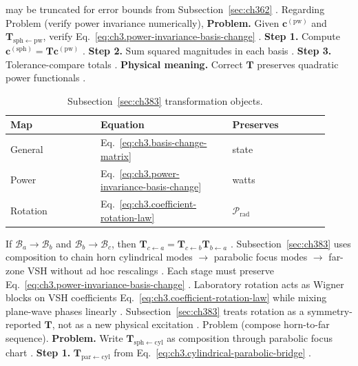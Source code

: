 may be truncated for error bounds from Subsection~\ref{sec:ch362} \cite{harrington2001}.
Regarding Problem (verify power invariance numerically), \textbf{Problem.} Given \(\mathbf{c}^{(\mathrm{pw})}\) and \(\mathbf{T}_{\mathrm{sph}\leftarrow\mathrm{pw}}\), verify
Eq.~\eqref{eq:ch3.power-invariance-basis-change} \cite{harrington2001}.
\textbf{Step 1.} Compute \(\mathbf{c}^{(\mathrm{sph})}=\mathbf{T}\mathbf{c}^{(\mathrm{pw})}\) \cite{hansen1988}.
\textbf{Step 2.} Sum squared magnitudes in each basis \cite{poynting1884}.
\textbf{Step 3.} Tolerance-compare totals \cite{harrington2001}.
\textbf{Physical meaning.} Correct \(\mathbf{T}\) preserves quadratic power functionals \cite{stratton1941}.
\begin{table}[t]
\centering
\caption{Subsection~\ref{sec:ch383} transformation objects.}
\label{tab:ch3.383-transform-objects}
\small
\begin{tabular}{@{}p{0.26\linewidth}p{0.38\linewidth}p{0.28\linewidth}@{}}
\toprule
Map & Equation & Preserves \\
\midrule
General & Eq.~\eqref{eq:ch3.basis-change-matrix} & state \\
Power & Eq.~\eqref{eq:ch3.power-invariance-basis-change} & watts \\
Rotation & Eq.~\eqref{eq:ch3.coefficient-rotation-law} & \(\mathcal{P}_{\mathrm{rad}}\) \\
\bottomrule
\end{tabular}
\end{table}
If \(\mathcal{B}_{a}\to\mathcal{B}_{b}\) and \(\mathcal{B}_{b}\to\mathcal{B}_{c}\), then
\(\mathbf{T}_{c\leftarrow a}=\mathbf{T}_{c\leftarrow b}\mathbf{T}_{b\leftarrow a}\) \cite{hansen1988}. Subsection~\ref{sec:ch383}
uses composition to chain horn cylindrical modes \(\to\) parabolic focus modes \(\to\) far-zone VSH without ad hoc rescalings
\cite{harrington2001}. Each stage must preserve Eq.~\eqref{eq:ch3.power-invariance-basis-change} \cite{poynting1884}.
Laboratory rotation acts as Wigner blocks on VSH coefficients Eq.~\eqref{eq:ch3.coefficient-rotation-law} while mixing plane-wave
phases linearly \cite{jackson1999}. Subsection~\ref{sec:ch383} treats rotation as a symmetry-reported \(\mathbf{T}\), not as a
new physical excitation \cite{stratton1941}.
Problem (compose horn-to-far sequence). \textbf{Problem.} Write \(\mathbf{T}_{\mathrm{sph}\leftarrow\mathrm{cyl}}\) as composition through parabolic focus chart
\cite{harrington2001}.
\textbf{Step 1.} \(\mathbf{T}_{\mathrm{par}\leftarrow\mathrm{cyl}}\) from Eq.~\eqref{eq:ch3.cylindrical-parabolic-bridge} \cite{hansen1988}.
